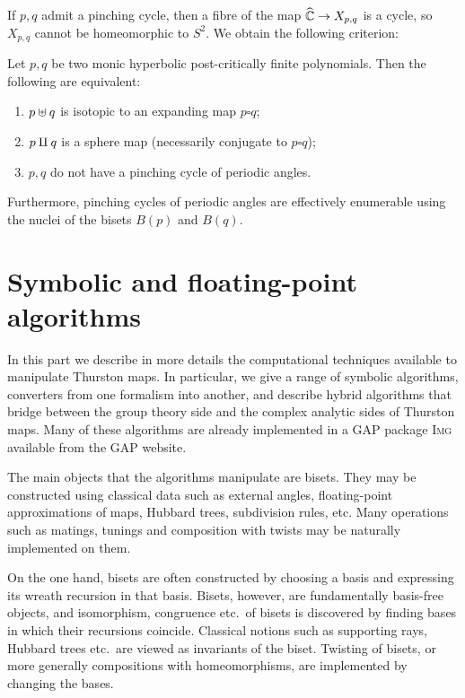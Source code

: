 \documentclass{amsart}
\begin{document}
If $p,q$ admit a pinching cycle, then a fibre of the
map ${\widehat{{\mathbb C}}}\to X_{p,q}$ is a cycle, so $X_{p,q}$ cannot be homeomorphic
to $S^2$. We obtain the following criterion:
\begin{thm}
  Let $p,q$ be two monic hyperbolic post-critically finite polynomials. Then
  the following are equivalent:
  \begin{enumerate}
  \item $p \uplus q$ is isotopic to an expanding map $p \square q$;
  \item $p \amalg q$ is a sphere map (necessarily conjugate to $p \square q$);
  \item\label{thm:mating:3} $p, q$ do not have a pinching cycle of
    periodic angles.
  \end{enumerate}
\end{thm}

Furthermore, pinching cycles of periodic angles are effectively
enumerable using the nuclei of the bisets $B(p)$ and $B(q)$.

\section{Symbolic and floating-point algorithms~\cite{bartholdi-dudko:bc5}}
In this part we describe in more details the computational techniques
available to manipulate Thurston maps. In particular, we give a range
of symbolic algorithms, converters from one formalism into another,
and describe hybrid algorithms that bridge between the group theory
side and the complex analytic sides of Thurston maps. Many of these
algorithms are already implemented in a GAP package
\textsc{Img}~\cite{img:manual} available from the GAP website.

The main objects that the algorithms manipulate are bisets. They may
be constructed using classical data such as external angles,
floating-point approximations of maps, Hubbard trees, subdivision
rules, etc. Many operations such as matings, tunings and composition
with twists may be naturally implemented on them.

On the one hand, bisets are often constructed by choosing a basis and
expressing its wreath recursion in that basis. Bisets, however, are
fundamentally basis-free objects, and isomorphism, congruence etc.\ of
bisets is discovered by finding bases in which their recursions
coincide. Classical notions such as supporting rays, Hubbard trees
etc.\ are viewed as invariants of the biset. Twisting of bisets, or
more generally compositions with homeomorphisms, are implemented by
changing the bases.
\end{document}
